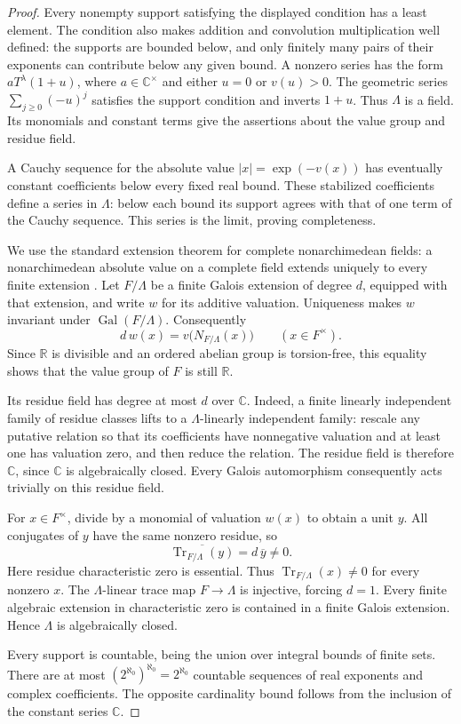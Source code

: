 \documentclass[11pt]{article}
\numberwithin{equation}{section}
\theoremstyle{definition}
\theoremstyle{remark}
\begin{document}
\begin{proof}
Every nonempty support satisfying the displayed condition has a least
element.  The condition also makes addition and convolution
multiplication well defined: the supports are bounded below, and only
finitely many pairs of their exponents can contribute below any given
bound.  A nonzero series has the form $aT^\lambda(1+u)$, where
$a\in\mathbb C^\times$ and either $u=0$ or $v(u)>0$.  The geometric series
$\sum_{j\ge0}(-u)^j$ satisfies the support condition and inverts $1+u$.
Thus $\Lambda$ is a field.  Its monomials and constant terms give the
assertions about the value group and residue field.

A Cauchy sequence for the absolute value $|x|=\exp(-v(x))$ has eventually
constant coefficients below every fixed real bound.  These stabilized
coefficients define a series in $\Lambda$: below each bound its support
agrees with that of one term of the Cauchy sequence.  This series is the
limit, proving completeness.

We use the standard extension theorem for complete nonarchimedean
fields: a nonarchimedean absolute value on a complete field extends
uniquely to every finite extension
\cite[Theorem~6.4]{Field:ConradAbsoluteValues}.
Let $F/\Lambda$ be a finite Galois extension of degree $d$, equipped
with that extension, and write $w$ for its additive valuation.  Uniqueness
makes $w$ invariant under $\operatorname{Gal}(F/\Lambda)$.  Consequently
\[
 d\,w(x)=v\bigl(N_{F/\Lambda}(x)\bigr)
 \qquad(x\in F^\times).
\]
Since $\mathbb R$ is divisible and an ordered abelian group is torsion-free,
this equality shows that the value group of $F$ is still $\mathbb R$.

Its residue field has degree at most $d$ over $\mathbb C$.  Indeed, a finite
linearly independent family of residue classes lifts to a
$\Lambda$-linearly independent family: rescale any putative relation
so that its coefficients have nonnegative valuation and at least one
has valuation zero, and then reduce the relation.  The residue field
is therefore $\mathbb C$, since $\mathbb C$ is algebraically closed.  Every Galois
automorphism consequently acts trivially on this residue field.

For $x\in F^\times$, divide by a monomial of valuation $w(x)$ to obtain
a unit $y$.  All conjugates of $y$ have the same nonzero residue, so
\[
 \overline{\operatorname{Tr}_{F/\Lambda}(y)}
       =d\,\overline y\ne0.
\]
Here residue characteristic zero is essential.  Thus
$\operatorname{Tr}_{F/\Lambda}(x)\ne0$ for every nonzero $x$.
The $\Lambda$-linear trace map $F\to\Lambda$ is injective, forcing
$d=1$.  Every finite algebraic extension in characteristic zero is
contained in a finite Galois extension.  Hence $\Lambda$ is
algebraically closed.

Every support is countable, being the union over integral bounds of
finite sets.  There are at most
$(2^{\aleph_0})^{\aleph_0}=2^{\aleph_0}$ countable sequences of real
exponents and complex coefficients.  The opposite cardinality bound
follows from the inclusion of the constant series $\mathbb C$.
\end{proof}
\end{document}
